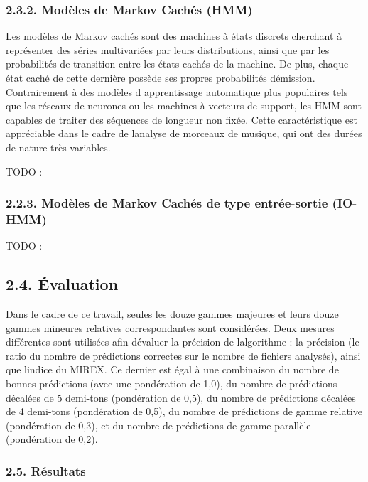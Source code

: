 \documentclass[letterpaper]{article}
\begin{document}
\FloatBarrier

\subsubsection*{2.3.2. Modèles de Markov Cachés (HMM)}

Les modèles de Markov cachés sont des machines à états discrets cherchant à représenter des séries multivariées par
leurs distributions, ainsi que par les probabilités de transition entre les états cachés de la machine. De plus, chaque état
caché de cette dernière possède ses propres probabilités d\textquotesingle émission. Contrairement à des modèles d\textquotesingle
apprentissage automatique plus populaires tels que les réseaux de neurones ou les machines à vecteurs de support,
les HMM sont capables de traiter des séquences de longueur non fixée. Cette caractéristique est appréciable dans le cadre
de l\textquotesingle analyse de morceaux de musique, qui ont des durées de nature très variables.

TODO : \citep{JP} \citep{DR}

\subsubsection*{2.2.3. Modèles de Markov Cachés de type entrée-sortie (IO-HMM)}

TODO : \citep{YB}

\subsection*{2.4. Évaluation}

Dans le cadre de ce travail, seules les douze gammes majeures et leurs douze gammes mineures relatives correspondantes sont considérées.
Deux mesures différentes sont utilisées afin d\textquotesingle évaluer la précision de l\textquotesingle algorithme : 
la précision (le ratio du nombre de prédictions correctes sur le nombre de fichiers analysés), ainsi que l\textquotesingle indice du MIREX.
Ce dernier est égal à une combinaison du nombre de bonnes prédictions (avec une pondération de 1,0), du nombre de prédictions décalées de
5 demi-tons (pondération de 0,5), du nombre de prédictions décalées de 4 demi-tons (pondération de 0,5), du nombre de prédictions de gamme
relative (pondération de 0,3), et du nombre de prédictions de gamme parallèle (pondération de 0,2).


\subsubsection*{2.5. Résultats}
\end{document}
